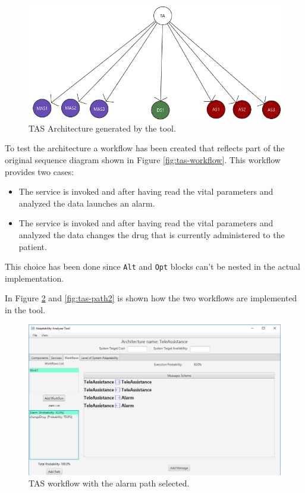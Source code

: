 \begin{figure}[ht]
	\centerline
	{\includegraphics[scale=0.55]{img/TeleAssistance.png}}
	\caption[TAS Architecture]{TAS Architecture generated by the tool.}
	\label{fig:tas-arch}
\end{figure}

To test the architecture a workflow has been created that reflects part of the original sequence diagram shown in Figure \ref{fig:tas-workflow}. This workflow provides two cases:
\begin{itemize}
	\item The service is invoked and after having read the vital parameters and analyzed the data launches an alarm.
	\item The service is invoked and after having read the vital parameters and analyzed the data changes the drug that is currently administered to the patient.
\end{itemize}

This choice has been done since \texttt{Alt} and \texttt{Opt} blocks can't be nested in the actual implementation.

In Figure \ref{fig:tas-path1} and \ref{fig:tas-path2} is shown how the two workflows are implemented in the tool.
\begin{figure}[ht]
	\centerline
	{\includegraphics[scale=0.55]{img/TeleAssistancePath1.png}}
	\caption[TAS Workflow Path Alarm]{TAS workflow with the alarm path selected.}
	\label{fig:tas-path1}
\end{figure}

